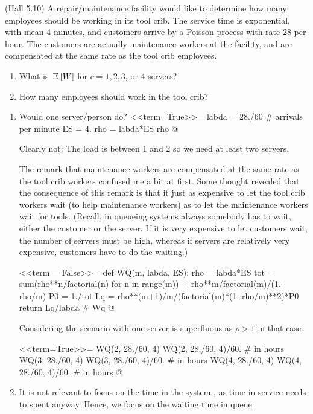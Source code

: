 \begin{question}
  (Hall 5.10) A repair/maintenance facility would like to determine
  how many employees should be working in its tool crib. The service
  time is exponential, with mean 4 minutes, and customers arrive by a
  Poisson process with rate 28 per hour. The customers are actually
  maintenance workers at the facility, and are compensated at the same
  rate as the tool crib employees.
  \begin{enumerate}
  \item What is $\,\mathbb{E}\left[W\right]$ for $c=1, 2, 3$, or $4$ servers?
  \item How many employees should work in the tool crib?
  \end{enumerate}

  \begin{solution}
    \begin{enumerate}
    \item 
      Would one server/person do? 
<<term=True>>=
labda = 28./60 # arrivals per minute
ES = 4.
rho = labda*ES
rho
@ 

Clearly not: The load is between 1 and 2 so we need at least two servers. 

The remark that maintenance workers are compensated at the same rate
as the tool crib workers confused me a bit at first.  Some thought
revealed that the consequence of this remark is that it just as
expensive to let the tool crib workers wait (to help maintenance
workers) as to let the maintenance workers wait for tools. (Recall, in
queueing systems always somebody has to wait, either the customer or
the server. If it is very expensive to let customers wait, the number
of servers must be high, whereas if servers are relatively very
expensive, customers have to do the waiting.)

<<term = False>>=
def WQ(m, labda, ES):
    rho = labda*ES
    tot = sum(rho**n/factorial(n) for n in range(m)) + rho**m/factorial(m)/(1.-rho/m)
    P0 = 1./tot
    Lq = rho**(m+1)/m/(factorial(m)*(1.-rho/m)**2)*P0
    return Lq/labda # Wq
@ 

Considering the scenario with one server is superfluous as $\rho>1$ in
that case.

<<term=True>>=
WQ(2, 28./60, 4)
WQ(2, 28./60, 4)/60. # in hours
WQ(3, 28./60, 4)
WQ(3, 28./60, 4)/60. # in hours
WQ(4, 28./60, 4)
WQ(4, 28./60, 4)/60. # in hours
@ 

\item 
      It is not relevant to focus on the time in the system , as time in
service needs to spent anyway. Hence, we focus on the waiting time in
queue.


\end{enumerate}
\end{solution}
\end{question}
